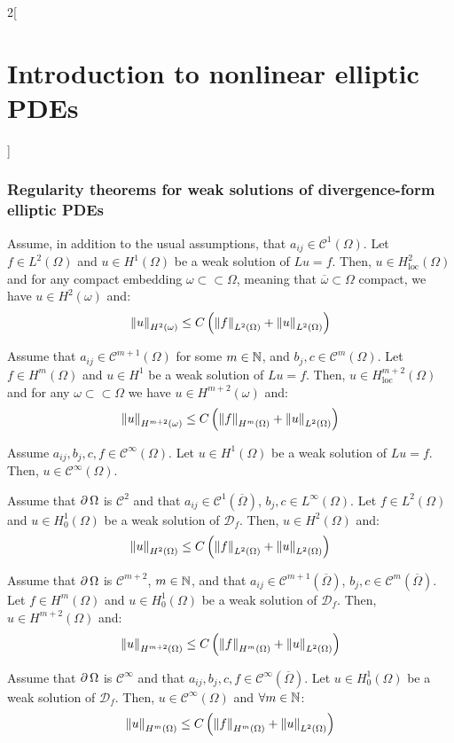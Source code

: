 \documentclass[../../../main_math.tex]{subfiles}
\begin{document}
\begin{multicols}{2}[\section{Introduction to nonlinear elliptic PDEs}]
  \subsubsection{Regularity theorems for weak solutions of divergence-form elliptic PDEs}
  \begin{theorem}
    Assume, in addition to the usual assumptions, that $a_{ij}\in \mathcal{C}^1(\Omega)$. Let $f\in L^2(\Omega)$ and $u\in H^1(\Omega)$ be a weak solution of $Lu=f$. Then, $u\in H^2_{\text{loc}}(\Omega)$ and for any compact embedding $\omega\subset\subset \Omega$, meaning that $\overline{\omega}\subset\Omega$ compact, we have $u\in H^2(\omega)$ and:
    $$
      \left\|u\right\|_{H^2(\omega)}\leq C\left(\left\|f\right\|_{L^2(\Omega)}+\left\|u\right\|_{L^2(\Omega)}\right)
    $$
  \end{theorem}
  \begin{corollary}
    Assume that $a_{ij}\in\mathcal{C}^{m+1}(\Omega)$ for some $m\in\mathbb{N}$, and $b_j,c\in \mathcal{C}^{m}(\Omega)$. Let $f\in H^{m}(\Omega)$ and $u\in H^1$ be a weak solution of $Lu=f$. Then, $u\in H^{m+2}_{\text{loc}}(\Omega)$ and for any $\omega\subset\subset \Omega$ we have $u\in H^{m+2}(\omega)$ and:
    $$
      \left\|u\right\|_{H^{m+2}(\omega)}\leq C\left(\left\|f\right\|_{H^{m}(\Omega)}+\left\|u\right\|_{L^2(\Omega)}\right)
    $$
  \end{corollary}
  \begin{corollary}
    Assume $a_{ij},b_j,c,f\in\mathcal{C}^\infty(\Omega)$. Let $u\in H^1(\Omega)$ be a weak solution of $Lu=f$. Then, $u\in \mathcal{C}^\infty(\Omega)$.
  \end{corollary}
  \begin{theorem}
    Assume that $\operatorname{\partial}{\Omega}$ is $\mathcal{C}^2$ and that $a_{ij}\in \mathcal{C}^1(\overline{\Omega})$, $b_j,c\in L^\infty(\Omega)$. Let $f\in L^2(\Omega)$ and $u\in H^1_0(\Omega)$ be a weak solution of $\mathcal{D}_f$. Then, $u\in H^2(\Omega)$ and:
    $$
      \left\|u\right\|_{H^2(\Omega)}\leq C\left(\left\|f\right\|_{L^2(\Omega)}+\left\|u\right\|_{L^2(\Omega)}\right)
    $$
  \end{theorem}
  \begin{corollary}
    Assume that $\operatorname{\partial}{\Omega}$ is $\mathcal{C}^{m+2}$, $m\in\mathbb{N}$, and that $a_{ij}\in \mathcal{C}^{m+1}(\overline{\Omega})$, $b_j,c\in \mathcal{C}^{m}(\overline{\Omega})$. Let $f\in H^{m}(\Omega)$ and $u\in H^1_0(\Omega)$ be a weak solution of $\mathcal{D}_f$. Then, $u\in H^{m+2}(\Omega)$ and:
    $$
      \left\|u\right\|_{H^{m+2}(\Omega)}\leq C\left(\left\|f\right\|_{H^{m}(\Omega)}+\left\|u\right\|_{L^2(\Omega)}\right)
    $$
  \end{corollary}
  \begin{corollary}
    Assume that $\operatorname{\partial}{\Omega}$ is $\mathcal{C}^\infty$ and that $a_{ij},b_j,c,f\in \mathcal{C}^\infty(\overline{\Omega})$. Let $u\in H^1_0(\Omega)$ be a weak solution of $\mathcal{D}_f$. Then, $u\in \mathcal{C}^\infty(\Omega)$ and $\forall m\in \mathbb{N}$:
    $$
      \left\|u\right\|_{H^{m}(\Omega)}\leq C\left(\left\|f\right\|_{H^{m}(\Omega)}+\left\|u\right\|_{L^2(\Omega)}\right)
    $$
  \end{corollary}

\end{multicols}
\end{document}

